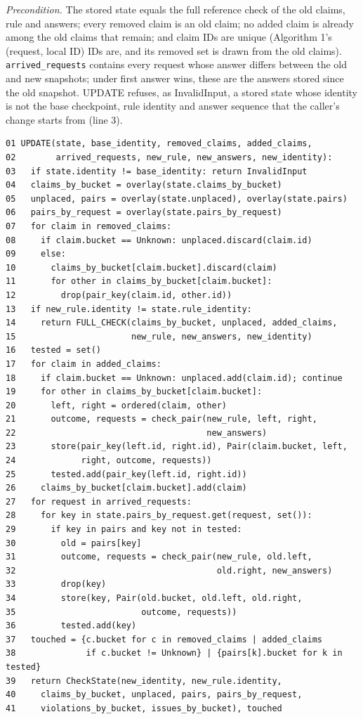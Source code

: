\documentclass[11pt]{article}
\newcommand{\code}[1]{\texttt{#1}}
\begin{document}
\textit{Precondition.} The stored state equals the full reference check of the
old claims, rule and answers; every removed claim is an old claim; no added claim
is already among the old claims that remain; and claim IDs are unique (Algorithm 1's (request, local ID) IDs are, and its removed set
is drawn from the old claims). \code{arrived\_requests} contains every request
whose answer differs between the old and new snapshots; under first answer
wins, these are the answers stored since the old snapshot. UPDATE refuses, as
InvalidInput, a stored state whose identity is not the base checkpoint, rule
identity and answer sequence that the caller's change starts from (line 3).

\begin{algorithm}[tbp]
{\footnotesize
\begin{verbatim}
01 UPDATE(state, base_identity, removed_claims, added_claims,
02        arrived_requests, new_rule, new_answers, new_identity):
03   if state.identity != base_identity: return InvalidInput
04   claims_by_bucket = overlay(state.claims_by_bucket)
05   unplaced, pairs = overlay(state.unplaced), overlay(state.pairs)
06   pairs_by_request = overlay(state.pairs_by_request)
07   for claim in removed_claims:
08     if claim.bucket == Unknown: unplaced.discard(claim.id)
09     else:
10       claims_by_bucket[claim.bucket].discard(claim)
11       for other in claims_by_bucket[claim.bucket]:
12         drop(pair_key(claim.id, other.id))
13   if new_rule.identity != state.rule_identity:
14     return FULL_CHECK(claims_by_bucket, unplaced, added_claims,
15                       new_rule, new_answers, new_identity)
16   tested = set()
17   for claim in added_claims:
18     if claim.bucket == Unknown: unplaced.add(claim.id); continue
19     for other in claims_by_bucket[claim.bucket]:
20       left, right = ordered(claim, other)
21       outcome, requests = check_pair(new_rule, left, right,
22                                      new_answers)
23       store(pair_key(left.id, right.id), Pair(claim.bucket, left,
24             right, outcome, requests))
25       tested.add(pair_key(left.id, right.id))
26     claims_by_bucket[claim.bucket].add(claim)
27   for request in arrived_requests:
28     for key in state.pairs_by_request.get(request, set()):
29       if key in pairs and key not in tested:
30         old = pairs[key]
31         outcome, requests = check_pair(new_rule, old.left,
32                                        old.right, new_answers)
33         drop(key)
34         store(key, Pair(old.bucket, old.left, old.right,
35                         outcome, requests))
36         tested.add(key)
37   touched = {c.bucket for c in removed_claims | added_claims
38              if c.bucket != Unknown} | {pairs[k].bucket for k in tested}
39   return CheckState(new_identity, new_rule.identity,
40     claims_by_bucket, unplaced, pairs, pairs_by_request,
41     violations_by_bucket, issues_by_bucket), touched
\end{verbatim}}
\caption{UPDATE maintains one rule's pair outcomes.}\label{alg:update}
\end{algorithm}
\end{document}

